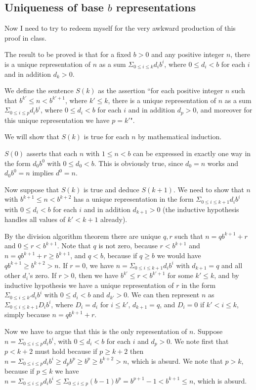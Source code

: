\documentclass[12pt]{article}
\begin{document}
\subsection{Uniqueness of base $b$ representations}

Now I need to try to redeem myself for the very awkward production of this proof in class.

The result to be proved is that for a fixed $b>0$ and any positive integer $n$, there is a unique representation
of $n$ as a sum $\Sigma_{0 \leq i \leq k}d_ib^i$, where $0 \leq d_i <b$ for each $i$ and in addition $d_k>0$.

We define the sentence $S(k)$ as the assertion ``for each positive integer $n$ such that $b^{k'} \leq n < b^{k'+1}$, where $k' \leq k$,
there is a unique representation
of $n$ as a sum $\Sigma_{0 \leq i \leq p}d_ib^i$, where $0 \leq d_i <b$ for each $i$ and in addition $d_{p}>0$, and moreover for this unique representation we have $p=k'$".

We will show that $S(k)$ is true for each $n$ by mathematical induction.

$S(0)$ asserts that each $n$ with $1 \leq n <b$ can be expressed in exactly one way in the form $d_0b^0$ with
$0 \leq d_0 <b$.  This is obviously true, since $d_0  = n$ works and $d_0b^0 = n$ implies $d^0 =n$.

Now suppose that $S(k)$ is true and deduce $S(k+1)$.  We need to show that $n$ with $b^{k+1} \leq n <b^{k+2}$
has a unique representation in the form $\Sigma_{0 \leq i \leq k+1}d_ib^i$ with $0 \leq d_i <b$ for each $i$ and in addition $d_{k+1}>0$ (the inductive hypothesis handles all values of $k' < k+1$ already).

By the division algorithm theorem there are unique $q,r$ such that $n=qb^{k+1}+r$ and $0 \leq r <b^{k+1}$.  Note that $q$ is not zero, because $r<b^{k+1}$ and $n=qb^{k+1}+r \geq b^{k+1}$, and $q < b$, because if $q\geq b$ we would have
$qb^{k+1} \geq b^{k+2} >n$.
If $r=0$, we have $n=\Sigma_{0 \leq i \leq k+1}d_ib^i$ with $d_{k+1} = q$ and all other $d_i$'s zero.
If $r>0$, then we have  $b^{k'} \leq r < b^{k'+1}$ for some $k' \leq k$, and by inductive hypothesis we have
a unique representation of $r$ in the form $\Sigma_{0 \leq i \leq k'}d_ib^i$ with $0 \leq d_i < b$ and $d_{k'}>0$.
We can then represent $n$ as $\Sigma_{0 \leq i \leq k+1}D_ib^i$, where $D_i = d_i$ for $i \leq k'$, $d_{k+1}=q$,
and $D_i=0$ if $k' <i\leq k$, simply because $n=qb^{k+1} + r$.

Now we have to argue that this is the only representation of $n$.  Suppose $n = \Sigma_{0 \leq i \leq p}d_ib^i$, with
$0 \leq d_i < b$ for each $i$ and $d_p >0$.  We note first that $p < k+2$ must hold because if $p\geq k+2$ then
$n = \Sigma_{0 \leq i \leq p}d_ib^i \geq d_pb^p \geq b^p \geq b^{k+2}>n$, which is absurd.  We note
that $p >k$, because if $p \leq k$ we have $n = \Sigma_{0 \leq i \leq p}d_ib^i \leq \Sigma_{0 \leq i \leq p}(b-1)b^p = b^{p+1}-1 < b^{k+1} \leq n$, which is absurd.
\end{document}
